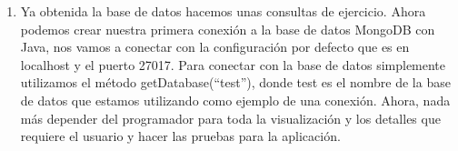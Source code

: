 \documentclass[10pt,a4paper]{article}
\begin{document}
\begin{enumerate}
\item Ya obtenida la base de datos hacemos unas consultas de ejercicio. Ahora podemos crear nuestra primera conexi\'on a la base de datos MongoDB con Java, nos vamos a conectar con la configuraci\'on por defecto que es en localhost y el puerto 27017. Para conectar con la base de datos simplemente utilizamos el m\'etodo getDatabase(“test”), donde test es el nombre de la base de datos que estamos utilizando como ejemplo de una conexi\'on. Ahora, nada m\'as depender del programador para toda la visualizaci\'on y los detalles que requiere el usuario y hacer las pruebas para la aplicaci\'on.


	
\end{enumerate}		
		














 
\renewcommand{\refname}{Referencias Bibliogr\'aficas}



 

\end{document}
